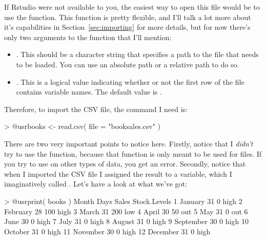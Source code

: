 If Rstudio were not available to you, the easiest way to open this file would be to use the  function. This function is pretty flexible, and I'll talk a lot more about it's capabilities in Section~\ref{sec:importing} for more details, but for now there's only two arguments to the function that I'll mention:
\begin{itemize}
\item {}. This should be a character string that specifies a path to the file that needs to be loaded. You can use an absolute path or a relative path to do so.
\item {}. This is a logical value indicating whether or not the first row of the file contains variable names. The default value is . 
\end{itemize}
Therefore, to import the CSV file, the command I need is:
\begin{rblock1}
> @usr{books <- read.csv( file = "booksales.csv" )}
\end{rblock1}
There are two very important points to notice here. Firstly, notice that I {\it didn't} try to use the  function, because that function is only meant to be used for  files. If you try to use  on other types of data, you get an error. Secondly, notice that when I imported the CSV file I assigned the result to a variable, which I imaginatively called . Let's have a look at what we've got:
\begin{rblock1}
> @usr{print( books )}
       Month Days Sales Stock.Levels
1    January   31     0         high
2   February   28   100         high
3      March   31   200          low
4      April   30    50          out
5        May   31     0          out
6       June   30     0         high
7       July   31     0         high
8     August   31     0         high
9  September   30     0         high
10   October   31     0         high
11  November   30     0         high
12  December   31     0         high
\end{rblock1}
